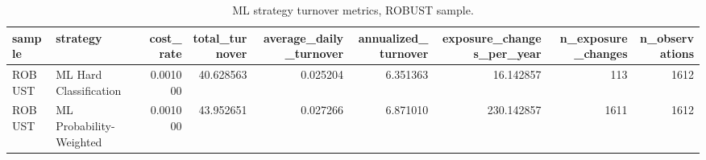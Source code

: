 \begin{table}
\caption{ML strategy turnover metrics, ROBUST sample.}
\label{tab:ml_turnover_metrics_robust}
\begin{tabular}{llrrrrrrr}
\toprule
sample & strategy & cost_rate & total_turnover & average_daily_turnover & annualized_turnover & exposure_changes_per_year & n_exposure_changes & n_observations \\
\midrule
ROBUST & ML Hard Classification & 0.001000 & 40.628563 & 0.025204 & 6.351363 & 16.142857 & 113 & 1612 \\
ROBUST & ML Probability-Weighted & 0.001000 & 43.952651 & 0.027266 & 6.871010 & 230.142857 & 1611 & 1612 \\
\bottomrule
\end{tabular}
\end{table}
